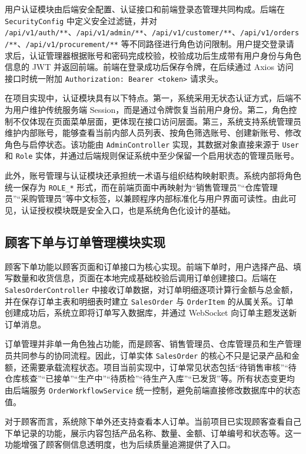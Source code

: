 用户认证模块由后端安全配置、认证接口和前端登录态管理共同构成。后端在 \texttt{SecurityConfig} 中定义安全过滤链，并对 \texttt{/api/v1/auth/**}、\texttt{/api/v1/admin/**}、\texttt{/api/v1/customer/**}、\texttt{/api/v1/orders/**}、\texttt{/api/v1/procurement/**} 等不同路径进行角色访问限制。用户提交登录请求后，认证管理器根据账号和密码完成校验，校验成功后生成带有用户身份与角色信息的 JWT 并返回前端。前端在登录成功后保存令牌，在后续通过 Axios 访问接口时统一附加 \texttt{Authorization: Bearer <token>} 请求头。

在项目实现中，认证模块具有以下特点。第一，系统采用无状态认证方式，后端不为用户维护传统服务端 Session，而是通过令牌恢复当前用户身份。第二，角色控制不仅体现在页面菜单层面，更体现在接口访问层面。第三，系统支持系统管理员维护内部账号，能够查看当前内部人员列表、按角色筛选账号、创建新账号、修改角色与启停状态。该功能由 \texttt{AdminController} 实现，其数据对象直接来源于 \texttt{User} 和 \texttt{Role} 实体，并通过后端规则保证系统中至少保留一个启用状态的管理员账号。

此外，账号管理与认证模块还承担统一术语与组织结构映射职责。系统内部将角色统一保存为 \texttt{ROLE\_*} 形式，而在前端页面中再映射为“销售管理员”“仓库管理员”“采购管理员”等中文标签，以兼顾程序内部标准化与用户界面可读性。由此可见，认证授权模块既是安全入口，也是系统角色化设计的基础。

\subsection{顾客下单与订单管理模块实现}

顾客下单功能以顾客页面和订单接口为核心实现。前端下单时，用户选择产品、填写数量和收货信息，页面在本地完成基础校验后调用订单创建接口。后端在 \texttt{SalesOrderController} 中接收订单数据，对订单明细逐项计算行金额与总金额，并在保存订单主表和明细表时建立 \texttt{SalesOrder} 与 \texttt{OrderItem} 的从属关系。订单创建成功后，系统立即将订单写入数据库，并通过 WebSocket 向订单主题发送新订单消息。

订单管理并非单一角色独占功能，而是顾客、销售管理员、仓库管理员和生产管理员共同参与的协同流程。因此，订单实体 \texttt{SalesOrder} 的核心不只是记录产品和金额，还需要承载流程状态。项目当前实现中，订单常见状态包括“待销售审核”“待仓库核查”“已接单”“生产中”“待质检”“待生产入库”“已发货”等。所有状态变更均由后端服务 \texttt{OrderWorkflowService} 统一控制，避免前端直接修改数据库中的状态值。

对于顾客而言，系统除下单外还支持查看本人订单。当前项目已实现顾客查看自己下单记录的功能，展示内容包括产品名称、数量、金额、订单编号和状态等。这一功能增强了顾客侧信息透明度，也为后续质量追溯提供了入口。

